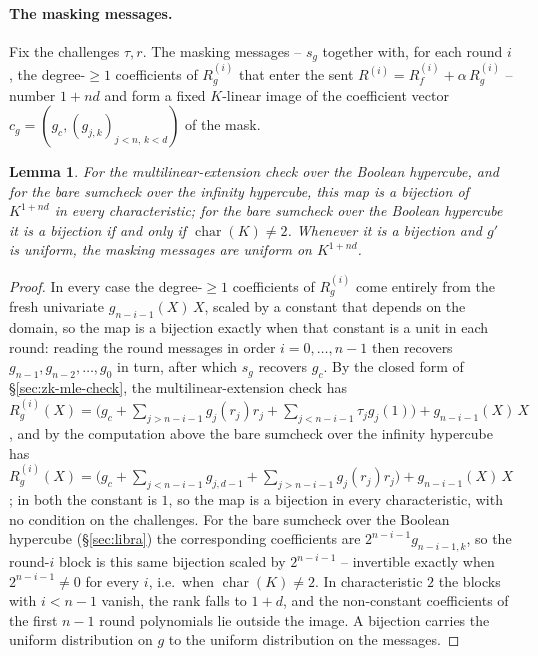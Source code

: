 \documentclass{article}
\newtheorem{lemma}[theorem]{Lemma}
\theoremstyle{definition}
\begin{document}
\paragraph{The masking messages.}
Fix the challenges $\tau, r$. The masking messages -- $s_g$ together with, for each round $i$, the degree-$\ge 1$ coefficients of $R_g^{(i)}$ that enter the sent $R^{(i)} = R_f^{(i)} + \alpha\, R_g^{(i)}$ -- number $1 + nd$ and form a fixed $K$-linear image of the coefficient vector $c_g = (g_c, (g_{j, k})_{j < n,\, k < d})$ of the mask.

\begin{lemma}
\label{lem:masking-uniform}
For the multilinear-extension check over the Boolean hypercube, and for the bare sumcheck over the infinity hypercube, this map is a bijection of $K^{1 + nd}$ in every characteristic; for the bare sumcheck over the Boolean hypercube it is a bijection if and only if $\operatorname{char}(K) \neq 2$. Whenever it is a bijection and $g'$ is uniform, the masking messages are uniform on $K^{1 + nd}$.
\end{lemma}

\begin{proof}
In every case the degree-$\ge 1$ coefficients of $R_g^{(i)}$ come entirely from the fresh univariate $g_{n - i - 1}(X)\, X$, scaled by a constant that depends on the domain, so the map is a bijection exactly when that constant is a unit in each round: reading the round messages in order $i = 0, \ldots, n - 1$ then recovers $g_{n - 1}, g_{n - 2}, \ldots, g_0$ in turn, after which $s_g$ recovers $g_c$. By the closed form of \S\ref{sec:zk-mle-check}, the multilinear-extension check has $R_g^{(i)}(X) = \bigl( g_c + \sum_{j > n - i - 1} g_j(r_j) r_j + \sum_{j < n - i - 1} \tau_j g_j(1) \bigr) + g_{n - i - 1}(X)\, X$, and by the computation above the bare sumcheck over the infinity hypercube has $R_g^{(i)}(X) = \bigl( g_c + \sum_{j < n - i - 1} g_{j, d - 1} + \sum_{j > n - i - 1} g_j(r_j) r_j \bigr) + g_{n - i - 1}(X)\, X$; in both the constant is $1$, so the map is a bijection in every characteristic, with no condition on the challenges. For the bare sumcheck over the Boolean hypercube (\S\ref{sec:libra}) the corresponding coefficients are $2^{n - i - 1} g_{n - i - 1, k}$, so the round-$i$ block is this same bijection scaled by $2^{n - i - 1}$ -- invertible exactly when $2^{n - i - 1} \neq 0$ for every $i$, i.e.\ when $\operatorname{char}(K) \neq 2$. In characteristic $2$ the blocks with $i < n - 1$ vanish, the rank falls to $1 + d$, and the non-constant coefficients of the first $n - 1$ round polynomials lie outside the image. A bijection carries the uniform distribution on $g$ to the uniform distribution on the messages.
\end{proof}
\end{document}
